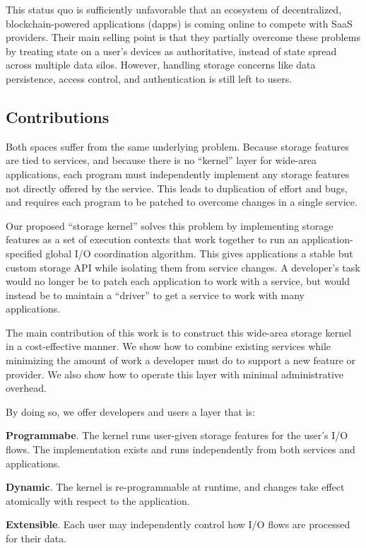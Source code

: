 This status quo is sufficiently unfavorable that an ecosystem of decentralized,
blockchain-powered applications (dapps) is coming online to compete with SaaS
providers. Their main selling point is that they partially overcome these
problems by treating state on a user's devices as authoritative, instead of
state spread across multiple data silos. However, handling storage concerns
like data persistence, access control, and authentication is still left to
users.

\subsection{Contributions}

Both spaces suffer from the same underlying problem. Because storage features
are tied to services, and because there is no ``kernel'' layer for
wide-area applications, each program must independently implement any storage
features not directly offered by the service.  This leads to duplication of
effort and bugs, and requires each program to be patched to overcome changes in
a single service.

Our proposed ``storage kernel'' solves this problem by implementing
storage features as a set of execution contexts that work together to run an 
application-specified global I/O coordination algorithm.  This gives
applications a stable but
custom storage API while isolating them from service changes.  A
developer's task would no longer be to patch each application to work with a
service, but would instead be to maintain a ``driver'' to get a service to
work with many applications.

The main contribution of this work is to construct this
wide-area storage kernel in a cost-effective manner.  We show how to
combine existing services while minimizing the amount of work
a developer must do to support a new feature or provider.  We also show
how to operate this layer with minimal administrative overhead.

By doing so, we offer developers and users a layer that is:

\textbf{Programmabe}. The kernel runs user-given storage features for the user's
I/O flows.  The implementation exists and runs independently from both
services and applications.

\textbf{Dynamic}. The kernel is re-programmable at
runtime, and changes take effect atomically with respect to the application.

\textbf{Extensible}.  Each user may independently control how I/O flows are
processed for their data.

